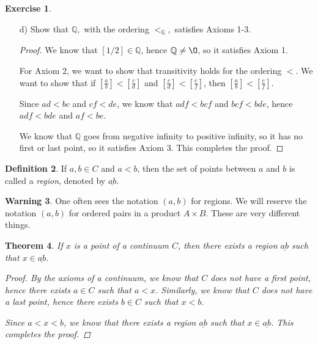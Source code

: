 \documentclass[11pt]{article}
\newcommand{\bbQ}{\mathbb{Q}}
\renewcommand{\emptyset}{\O}
\renewcommand{\_}[1]{\underline{ #1 }}
\newtheorem{theorem}{Theorem}[section]
\theoremstyle{definition}
\newtheorem{definition}[theorem]{Definition}
\newtheorem{exercise}[theorem]{Exercise}
\newtheorem{warning}[theorem]{Warning}
\numberwithin{equation}{subsection}
\begin{document}
\begin{exercise}
\begin{enumerate}
\begin{proof}
We know that $ab' = a'b$ and $cd' = c'd$. Hence $ab'dd' = a'bdd'$, where we are multiplying by $dd'$ since $d,d'>0$. 

Then, $ab'dd' = adb'd' < bcb'd'$. Therefore $ab'dd' < bcb'd'$, hence $ab'dd' < cd'bb'$, hence $ab'dd' < c'dbb'$.

Hence, $a'd'bd < b'c'bd$, hence $a'd'<b'c'$. This completes the proof.



\renewcommand\qedsymbol{QED}
\end{proof}

\item[d)] Show that $\bbQ,$ with the ordering $<_{\bbQ},$ satisfies Axioms 1-3.

\begin{proof}
We know that $[1/2] \in \bbQ$, hence $\bbQ \not= \emptyset$, so it satisfies Axiom 1.

For Axiom 2, we want to show that transitivity holds for the ordering $<$. We want to show that if $[\frac{a}{b}] < [\frac{c}{d}]$ and $[\frac{c}{d}] < [\frac{e}{f}]$, then $[\frac{a}{b}] < [\frac{e}{f}]$.

Since $ad < bc$ and $cf < de$, we know that $adf < bcf$ and $bcf < bde$, hence $adf < bde$ and $af < be$. 

We know that $\bbQ$ goes from negative infinity to positive infinity, so it has no first or last point,
so it satisfies Axiom 3. This completes the proof.

\renewcommand\qedsymbol{QED}
\end{proof}

\end{enumerate}
\end{exercise}

\begin{definition} If $a,b\in C$ and $a < b$, then the set of points between $a$ and $b$ is called a \emph{region}, denoted by $\_{ab}$.  
\end{definition}

\begin{warning}  One often sees the notation $(a, b)$ for regions.  We will reserve the notation $(a, b)$ for ordered pairs in a product $A \times B$.  These are very different things.  
\end{warning}

\begin{theorem} If $x$ is a point of a continuum $C$, then there exists a region $\_{ab}$ such that $x \in \_{ab}$.
\begin{proof}
By the axioms of a continuum, we know that $C$ does not have a first point, hence there exists $a \in C$ such that $a <x$. Similarly, we know that $C$ does not have a last point, hence there exists $b \in C$ such that $x<b$.

Since $a < x <b$, we know that there exists a region $\_{ab}$ such that $x \in \_{ab}$. This completes the proof.

\renewcommand\qedsymbol{QED}
\end{proof}


\end{theorem}
\end{document}
